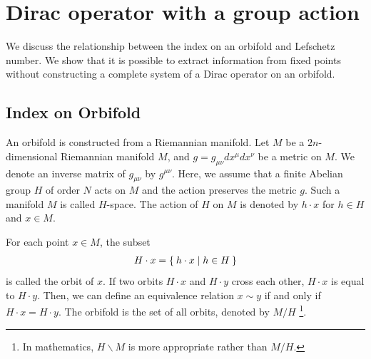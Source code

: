 \documentclass[11pt]{article}
\newcommand{\Lef}{Lefschetz }
\begin{document}
\section{Dirac operator with a group action}
\label{Section2}

We discuss the relationship between the index on an orbifold and \Lef number. %
We show that it is possible to extract information from fixed points without constructing a complete system of a Dirac operator on an orbifold.








\subsection{Index on Orbifold}


An orbifold is constructed from a Riemannian manifold. Let $M$ be a $2n$-dimensional Riemannian manifold $M$, and $g=g_{\mu \nu} dx^{\mu} dx^{\nu}$ be a metric on $M$. We denote an inverse matrix of $g_{\mu\nu}$ by $g^{\mu \nu}$. Here, we assume that a finite Abelian group $H$ of order $N$ acts on $M$ and the action preserves the metric $g$. Such a manifold $M$ is called $H$-space. The action of $H$ on $M$ is denoted by $ h \cdot x $ for $h \in H$ and $x \in M$. %

For each point $x \in M$, the subset
\begin{align}
    H \cdot x = \Set{ h \cdot x | h\in H} 
\end{align}
is called the orbit of $x$. If two orbits $H\cdot x$ and $H \cdot y$ cross each other, $H\cdot x$ is equal to $H \cdot y$. Then, we can define an equivalence relation $x \sim y$ if and only if $H \cdot x= H \cdot y$. %
The orbifold is the set of all orbits, denoted by $M/H$ \footnote{In mathematics, $H\backslash M$ is more appropriate rather than $M/H$.}.
\end{document}
